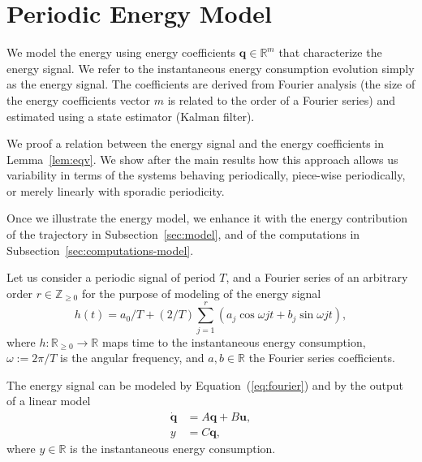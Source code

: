 \documentclass[letterpaper,10pt,conference]{ieeeconf}
\theoremstyle{definition}
\begin{document}
\section{Periodic Energy Model}
\label{sec:energy-model}

We model the energy using energy coefficients $\mathbf{q}\in\mathbb{R}^m$ that characterize the energy signal. We refer to the instantaneous energy consumption evolution simply as the energy signal. The coefficients are derived from Fourier analysis (the size of the energy coefficients vector $m$ is related to the order of a Fourier series) and estimated using a state estimator (Kalman filter). 

We proof a relation between the energy signal and the energy coefficients in Lemma~\ref{lem:eqv}. We show after the main results how this approach allows us variability in terms of the systems behaving periodically, piece-wise periodically, or merely linearly with sporadic periodicity.

Once we illustrate the energy model, we enhance it with the energy contribution of the trajectory in Subsection~\ref{sec:model}, and of the computations in Subsection~\ref{sec:computations-model}. 

Let us consider a periodic signal of period $T$, and a Fourier series of an arbitrary order $r\in\mathbb{Z}_{\geq 0}$ for the purpose of modeling of the energy signal
\begin{equation}\label{eq:fourier}
  h(t)=a_0/T+(2/T)\sum_{j=1}^{r}{\left(a_j\cos{\omega jt}+b_j\sin{\omega jt}\right)},
\end{equation}
where $h:\mathbb{R}_{\geq 0}\rightarrow\mathbb{R}$ maps time to the instantaneous energy consumption, $\omega:=2\pi/T$ is the angular frequency, and $a,b\in\mathbb{R}$ the Fourier series coefficients.

The energy signal can be modeled by Equation~(\ref{eq:fourier}) and by the output of a linear model
\begin{equation}\label{eq:state-perf}\begin{split}
  \dot{\mathbf{q}}&=A\mathbf{q}+B\mathbf{u},\\
  y&=C\mathbf{q},
\end{split}\end{equation}
where $y\in\mathbb{R}$ is the instantaneous energy consumption. 
\end{document}
